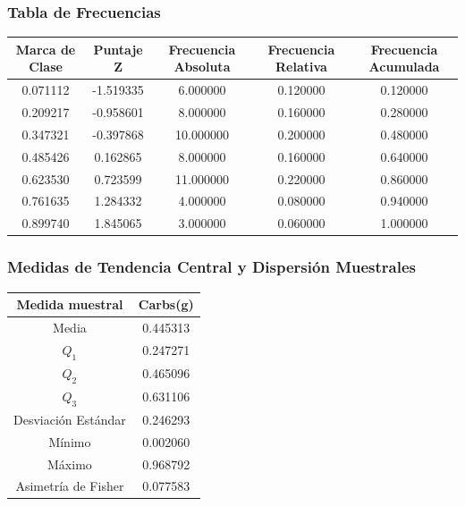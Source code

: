 \documentclass[12pt,a4paper]{article}
\begin{document}
    \subsubsection{Tabla de Frecuencias}
        \begin{center}
            \begin{tabular}{|c|c|c|c|c|}
                \hline
                Marca de Clase & Puntaje Z & Frecuencia Absoluta & Frecuencia Relativa & Frecuencia Acumulada \\
                \hline
                0.071112 & -1.519335 & 6.000000 & 0.120000 & 0.120000 \\
                0.209217 & -0.958601 & 8.000000 & 0.160000 & 0.280000 \\
                0.347321 & -0.397868 & 10.000000 & 0.200000 & 0.480000 \\
                0.485426 &  0.162865 & 8.000000 & 0.160000 & 0.640000 \\
                0.623530 &  0.723599 & 11.000000 & 0.220000 & 0.860000 \\
                0.761635 &  1.284332 & 4.000000 & 0.080000 & 0.940000 \\
                0.899740 &  1.845065 & 3.000000 & 0.060000 & 1.000000 \\
                \hline
            \end{tabular}
        \end{center} 

    \subsubsection{Medidas de Tendencia Central y Dispersión Muestrales}
        \begin{center}
            \begin{tabular}{|c|c|}
                \hline
                Medida muestral & Carbs(g) \\
                \hline
                Media & 0.445313 \\
                $Q_1$ & 0.247271 \\
                $Q_2$ & 0.465096 \\
                $Q_3$ & 0.631106 \\
                Desviación Estándar & 0.246293 \\
                Mínimo & 0.002060 \\
                Máximo & 0.968792 \\
                Asimetría de Fisher & 0.077583 \\
                \hline
                \end{tabular}
        \end{center}
    
\end{document}
